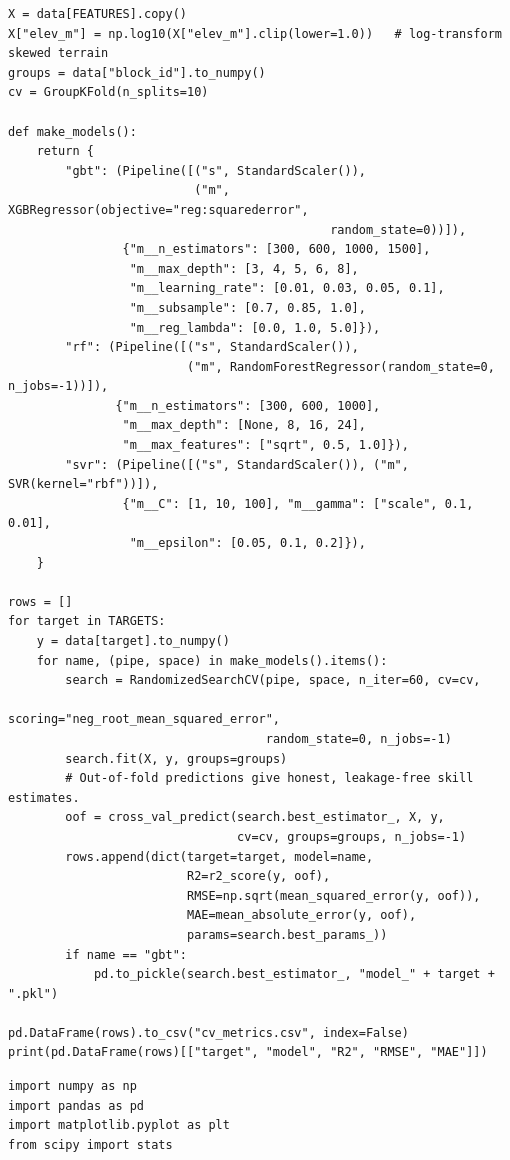 \documentclass[pdflatex,sn-mathphys-num]{sn-jnl}%
\theoremstyle{thmstyleone}%
\theoremstyle{thmstyletwo}%
\theoremstyle{thmstylethree}%
\begin{document}
\begin{appendices}
\begin{lstlisting}[style=py,caption={Full hyper-parameter search and spatially grouped cross-validation, fitted independently for each target field with random-forest and support-vector baselines.},label={lst:tune}]
X = data[FEATURES].copy()
X["elev_m"] = np.log10(X["elev_m"].clip(lower=1.0))   # log-transform skewed terrain
groups = data["block_id"].to_numpy()
cv = GroupKFold(n_splits=10)

def make_models():
    return {
        "gbt": (Pipeline([("s", StandardScaler()),
                          ("m", XGBRegressor(objective="reg:squarederror",
                                             random_state=0))]),
                {"m__n_estimators": [300, 600, 1000, 1500],
                 "m__max_depth": [3, 4, 5, 6, 8],
                 "m__learning_rate": [0.01, 0.03, 0.05, 0.1],
                 "m__subsample": [0.7, 0.85, 1.0],
                 "m__reg_lambda": [0.0, 1.0, 5.0]}),
        "rf": (Pipeline([("s", StandardScaler()),
                         ("m", RandomForestRegressor(random_state=0, n_jobs=-1))]),
               {"m__n_estimators": [300, 600, 1000],
                "m__max_depth": [None, 8, 16, 24],
                "m__max_features": ["sqrt", 0.5, 1.0]}),
        "svr": (Pipeline([("s", StandardScaler()), ("m", SVR(kernel="rbf"))]),
                {"m__C": [1, 10, 100], "m__gamma": ["scale", 0.1, 0.01],
                 "m__epsilon": [0.05, 0.1, 0.2]}),
    }

rows = []
for target in TARGETS:
    y = data[target].to_numpy()
    for name, (pipe, space) in make_models().items():
        search = RandomizedSearchCV(pipe, space, n_iter=60, cv=cv,
                                    scoring="neg_root_mean_squared_error",
                                    random_state=0, n_jobs=-1)
        search.fit(X, y, groups=groups)
        # Out-of-fold predictions give honest, leakage-free skill estimates.
        oof = cross_val_predict(search.best_estimator_, X, y,
                                cv=cv, groups=groups, n_jobs=-1)
        rows.append(dict(target=target, model=name,
                         R2=r2_score(y, oof),
                         RMSE=np.sqrt(mean_squared_error(y, oof)),
                         MAE=mean_absolute_error(y, oof),
                         params=search.best_params_))
        if name == "gbt":
            pd.to_pickle(search.best_estimator_, "model_" + target + ".pkl")

pd.DataFrame(rows).to_csv("cv_metrics.csv", index=False)
print(pd.DataFrame(rows)[["target", "model", "R2", "RMSE", "MAE"]])
\end{lstlisting}

\begin{lstlisting}[style=py,caption={Plotting and residual-diagnostic routine: predicted-versus-observed scatter, residual distribution and residual trend against the most influential predictor, for the held-out test set.},label={lst:plot}]
import numpy as np
import pandas as pd
import matplotlib.pyplot as plt
from scipy import stats


\end{lstlisting}
\end{appendices}
\end{document}
